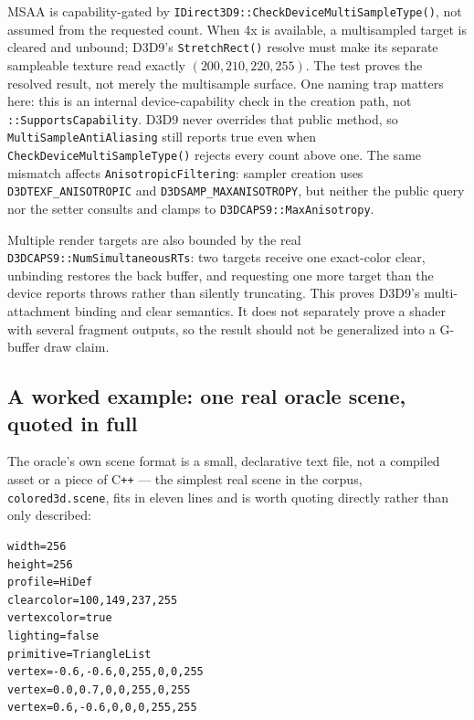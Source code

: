 MSAA is capability-gated by \texttt{IDirect3D9::CheckDeviceMultiSampleType()}, not assumed from
the requested count. When 4x is available, a multisampled target is cleared and unbound; D3D9's
\texttt{StretchRect()} resolve must make its separate sampleable texture read exactly
\((200,210,220,255)\). The test proves the resolved result, not merely the multisample surface.
One naming trap matters here: this is an internal device-capability check in the creation path,
not \texttt{::SupportsCapability}. D3D9 never overrides that public
method, so \texttt{MultiSampleAntiAliasing} still reports true even when
\texttt{CheckDeviceMultiSampleType()} rejects every count above one. The same mismatch affects
\texttt{AnisotropicFiltering}: sampler creation uses \texttt{D3DTEXF\_ANISOTROPIC} and
\texttt{D3DSAMP\_MAXANISOTROPY}, but neither the public query nor the setter consults and clamps
to \texttt{D3DCAPS9::MaxAnisotropy}.

Multiple render targets are also bounded by the real \texttt{D3DCAPS9::NumSimultaneousRTs}: two
targets receive one exact-color clear, unbinding restores the back buffer, and requesting one
more target than the device reports throws rather than silently truncating. This proves D3D9's
multi-attachment binding and clear semantics. It does not separately prove a shader with several
fragment outputs, so the result should not be generalized into a G-buffer draw claim.

\subsection{A worked example: one real oracle scene, quoted in full}

The oracle's own scene format is a small, declarative text file, not a compiled asset or a
piece of C\texttt{++} --- the simplest real scene in the corpus, \texttt{colored3d.scene},
fits in eleven lines and is worth quoting directly rather than only described:

\begin{lstlisting}
width=256
height=256
profile=HiDef
clearcolor=100,149,237,255
vertexcolor=true
lighting=false
primitive=TriangleList
vertex=-0.6,-0.6,0,255,0,0,255
vertex=0.0,0.7,0,0,255,0,255
vertex=0.6,-0.6,0,0,0,255,255
\end{lstlisting}

